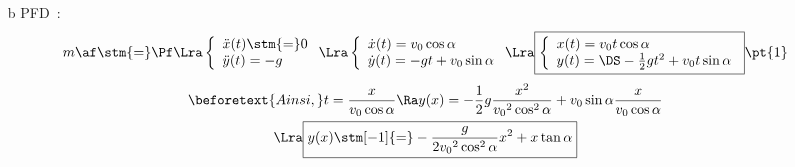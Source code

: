 \documentclass[a4paper, 10pt, final, garamond]{book}
\begin{document}
\begin{enumerate}[label=\sqenumi]
{\begin{minipage}[c]{0.39\linewidth}
\begin{center}
{				      }
				      \vspace{-15pt}
			      \end{center}
		      \end{minipage}
		      \begin{enumerate}[label=\sqenumi, start=6]
			      \item[b]{PFD}~:
			            \vspace{-15pt}
			            \[m\af \stm{=} \Pf
				            \Lra
				            \left\{
				            \begin{array}{l}
					            \ddot{x}(t) \stm{=} 0 \\
					            \ddot{y}(t) = -g
				            \end{array}
				            \right.
				            \Lra
				            \left\{
				            \begin{array}{l}
					            \dot{x}(t) = v_0\cos\alpha \\
					            \dot{y}(t) = -gt + v_0 \sin\alpha
				            \end{array}
				            \right.
				            \Lra
				            \boxed{
					            \left\{
					            \begin{array}{l}
						            x(t) = v_0t\cos\alpha \\
						            y(t) = \DS -\frac{1}{2}gt^2 + v_0t\sin\alpha
					            \end{array}
					            \right.}
				            \pt{1}
			            \]
			            \begin{gather*}
				            \beforetext{Ainsi,}
				            t = \frac{x}{v_0\cos\alpha}
				            \Ra
				            y(x) = - \frac{1}{2}g \frac{x^2}{v_0{}^2\cos^2\alpha} +
				            v_0\sin\alpha \frac{x}{v_0\cos\alpha}
				            \\\Lra
				            \boxed{y(x) \stm[-1]{=} - \frac{g}{2v_0{}^2\cos^2\alpha}x^2
				            + x\tan\alpha}
			            \end{gather*}
		      \end{enumerate}
	      }
\end{enumerate}
\end{document}
